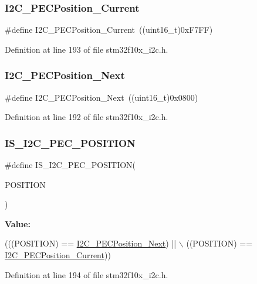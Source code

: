 \subsubsection{\texorpdfstring{I2\+C\+\_\+\+P\+E\+C\+Position\+\_\+\+Current}{I2C\_PECPosition\_Current}}
{\footnotesize\ttfamily \#define I2\+C\+\_\+\+P\+E\+C\+Position\+\_\+\+Current~((uint16\+\_\+t)0x\+F7\+F\+F)}



Definition at line 193 of file stm32f10x\+\_\+i2c.\+h.

\mbox{\label{group___i2_c___p_e_c__position_ga74d0996efe6e278fb28d053ba78fccc5}} 
\subsubsection{\texorpdfstring{I2\+C\+\_\+\+P\+E\+C\+Position\+\_\+\+Next}{I2C\_PECPosition\_Next}}
{\footnotesize\ttfamily \#define I2\+C\+\_\+\+P\+E\+C\+Position\+\_\+\+Next~((uint16\+\_\+t)0x0800)}



Definition at line 192 of file stm32f10x\+\_\+i2c.\+h.

\mbox{\label{group___i2_c___p_e_c__position_gac8611a62b06256b1b3c60d4859a016ef}} 
\subsubsection{\texorpdfstring{I\+S\+\_\+\+I2\+C\+\_\+\+P\+E\+C\+\_\+\+P\+O\+S\+I\+T\+I\+ON}{IS\_I2C\_PEC\_POSITION}}
{\footnotesize\ttfamily \#define I\+S\+\_\+\+I2\+C\+\_\+\+P\+E\+C\+\_\+\+P\+O\+S\+I\+T\+I\+ON(\begin{DoxyParamCaption}\item[{}]{P\+O\+S\+I\+T\+I\+ON }\end{DoxyParamCaption})}

{\bfseries Value\+:}
\begin{DoxyCode}
(((POSITION) == \hyperlink{group___i2_c___p_e_c__position_ga74d0996efe6e278fb28d053ba78fccc5}{I2C\_PECPosition\_Next}) || \(\backslash\)
                                       ((POSITION) == \hyperlink{group___i2_c___p_e_c__position_ga8a393364dd651f88bcaebac71c1c52c7}{I2C\_PECPosition\_Current}))
\end{DoxyCode}


Definition at line 194 of file stm32f10x\+\_\+i2c.\+h.

